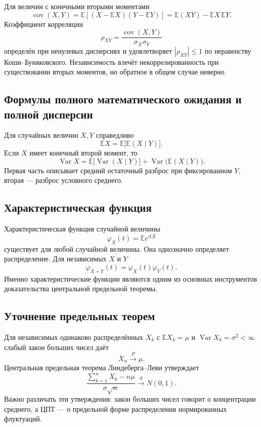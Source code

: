 Для величин с конечными вторыми моментами
\[
    \operatorname{cov}(X,Y)
    =\mathbb E[(X-\mathbb EX)(Y-\mathbb EY)]
    =\mathbb E(XY)-\mathbb EX\,\mathbb EY.
\]
Коэффициент корреляции
\[
    \rho_{XY}=\frac{\operatorname{cov}(X,Y)}{\sigma_X\sigma_Y}
\]
определён при ненулевых дисперсиях и удовлетворяет $|\rho_{XY}|\le1$ по
неравенству Коши--Буняковского. Независимость влечёт некоррелированность при
существовании вторых моментов, но обратное в общем случае неверно.

\subsection{Формулы полного математического ожидания и полной дисперсии}

Для случайных величин $X,Y$ справедливо
\[
    \mathbb E X=\mathbb E\bigl[\mathbb E(X\mid Y)\bigr].
\]
Если $X$ имеет конечный второй момент, то
\[
\operatorname{Var}X
=\mathbb E\bigl[\operatorname{Var}(X\mid Y)\bigr]
+\operatorname{Var}\bigl(\mathbb E(X\mid Y)\bigr).
\]
Первая часть описывает средний остаточный разброс при фиксированном $Y$, вторая ---
разброс условного среднего.

\subsection{Характеристическая функция}

Характеристическая функция случайной величины
\[
    \varphi_X(t)=\mathbb E e^{itX}
\]
существует для любой случайной величины. Она однозначно определяет распределение.
Для независимых $X$ и $Y$
\[
    \varphi_{X+Y}(t)=\varphi_X(t)\varphi_Y(t).
\]
Именно характеристические функции являются одним из основных инструментов
доказательства центральной предельной теоремы.

\subsection{Уточнение предельных теорем}

Для независимых одинаково распределённых $X_k$ с
$\mathbb EX_k=\mu$ и $\operatorname{Var}X_k=\sigma^2<\infty$ слабый закон больших
чисел даёт
\[
    \overline X_n\xrightarrow{P}\mu.
\]
Центральная предельная теорема Линдеберга--Леви утверждает
\[
    \frac{\sum_{k=1}^nX_k-n\mu}{\sigma\sqrt n}
    \xrightarrow{d}N(0,1).
\]
Важно различать эти утверждения: закон больших чисел говорит о концентрации среднего,
а ЦПТ --- о предельной форме распределения нормированных флуктуаций.

